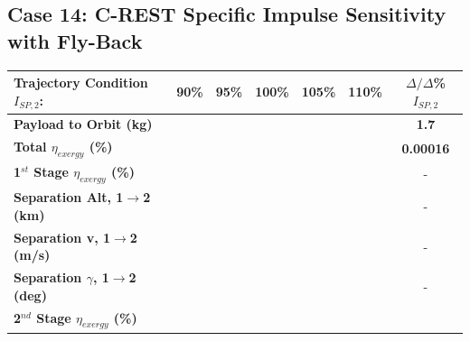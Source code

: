 \subsection{Case 14: C-REST Specific Impulse Sensitivity with Fly-Back}


\begin{table}[ht] %
	\centering
	\begin{tabular}{l c c c c c c} 
		\hline \textbf{Trajectory Condition}   \qquad  $I_{SP,2}$:
		&90\%
		&95\%
		&100\%
		&105\%
		&110\%
		& $\Delta/\Delta$\%$I_{SP,2}$
		\\
		\hline \textbf{Payload to Orbit (kg)}
		& \textbf{\PayloadToOrbitIspNinety}
		& \textbf{\PayloadToOrbitIspNinetyFive}
		& \textbf{\PayloadToOrbitIspStandard}
		& \textbf{\PayloadToOrbitIspOneHundredFive}
		& \textbf{\PayloadToOrbitIspOneHundredTen}
		&\textbf{1.7}
		\\
		\textbf{Total $\eta_{exergy}$ (\%)}
		& \textbf{\totalExergyEffIspNinety}
		& \textbf{\totalExergyEffIspNinetyFive}
		& \textbf{\totalExergyEffIspStandard}
		& \textbf{\totalExergyEffIspOneHundredFive}
		& \textbf{\totalExergyEffIspOneHundredTen}
		& \textbf{0.00016}
		\\
		\hline 
		\textbf{1$^{st}$ Stage $\eta_{exergy}$ (\%)}
		& \textbf{\firstExergyEffIspNinety}
		& \textbf{\firstExergyEffIspNinetyFive}
		& \textbf{\firstExergyEffIspStandard}
		& \textbf{\firstExergyEffIspOneHundredFive}
		& \textbf{\firstExergyEffIspOneHundredTen}
		& -
		\\
		\textbf{Separation Alt, 1$\rightarrow$2 (km)}
		& \firstsecondSeparationAltIspNinety
		& \firstsecondSeparationAltIspNinetyFive
		& \firstsecondSeparationAltIspStandard
		& \firstsecondSeparationAltIspOneHundredFive
		& \firstsecondSeparationAltIspOneHundredTen
		& -
		\\
		\textbf{Separation v, 1$\rightarrow$2 (m/s)}
		& \firstsecondSeparationvIspNinety
		& \firstsecondSeparationvIspNinetyFive
		& \firstsecondSeparationvIspStandard
		& \firstsecondSeparationvIspOneHundredFive
		& \firstsecondSeparationvIspOneHundredTen
		& -
		\\
		\textbf{Separation $\gamma$, 1$\rightarrow$2 (deg)}
		& \firstsecondSeparationgammaIspNinety
		& \firstsecondSeparationgammaIspNinetyFive
		& \firstsecondSeparationgammaIspStandard
		& \firstsecondSeparationgammaIspOneHundredFive
		& \firstsecondSeparationgammaIspOneHundredTen
		& -
		\\
		\hline 
		\textbf{2$^{nd}$ Stage $\eta_{exergy}$ (\%)}
		& \textbf{\secondExergyEffIspNinety}

\end{tabular}
\end{table}
